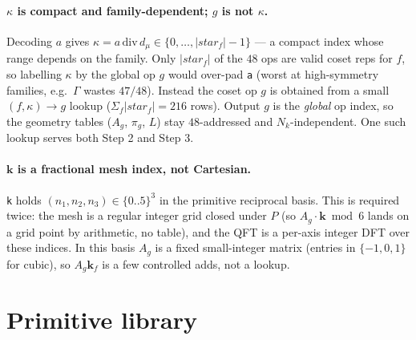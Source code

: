 \documentclass[11pt]{article}
\newcommand{\reg}[1]{\texttt{#1}}
\begin{document}
\paragraph{$\kappa$ is compact and family-dependent; $g$ is not $\kappa$.} Decoding $a$ gives
$\kappa=a\,\mathrm{div}\,d_\mu \in\{0,\dots,|star_f|-1\}$ --- a compact index whose range depends on
the family. Only $|star_f|$ of the $48$ ops are valid coset reps for $f$, so labelling $\kappa$ by the
global op $g$ would over-pad \reg{a} (worst at high-symmetry families, e.g.\ $\Gamma$ wastes $47/48$).
Instead the coset op $g$ is obtained from a small $(f,\kappa)\!\to\!g$ lookup ($\Sigma_f|star_f|=216$
rows). Output $g$ is the \emph{global} op index, so the geometry tables ($A_g$, $\pi_g$, $L$) stay
$48$-addressed and $N_k$-independent. One such lookup serves both Step 2 and Step 3.

\paragraph{$\mathbf k$ is a fractional mesh index, not Cartesian.} \reg{k} holds
$(n_1,n_2,n_3)\in\{0..5\}^3$ in the primitive reciprocal basis. This is required twice: the mesh is a
regular integer grid closed under $P$ (so $A_g\!\cdot\!\mathbf k \bmod 6$ lands on a grid point by
arithmetic, no table), and the QFT is a per-axis integer DFT over these indices. In this basis $A_g$ is
a fixed small-integer matrix (entries in $\{-1,0,1\}$ for cubic), so $A_g\mathbf k_f$ is a few
controlled adds, not a lookup.

\section{Primitive library}
\end{document}
